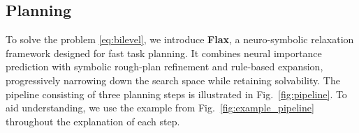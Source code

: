 \documentclass[letterpaper, 10pt, journal, twoside]{IEEEtran}
\newcommand{\fref}[1]{Fig.~\ref{#1}}
\newcommand{\shortname}{Flax\xspace}
\begin{document}


\subsection{Planning}
To solve the problem \eqref{eq:bilevel}, we introduce \textbf{\shortname}, a neuro-symbolic relaxation framework designed for fast task planning. It combines neural importance prediction with symbolic rough-plan refinement and rule-based expansion, progressively narrowing down the search space while retaining solvability.
The pipeline consisting of three planning steps is illustrated in \fref{fig:pipeline}.
To aid understanding, we use the example from \fref{fig:example_pipeline} throughout the explanation of each step.
\end{document}
